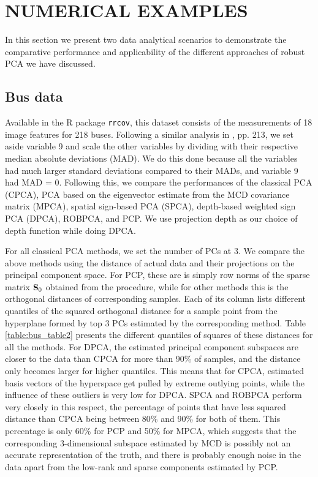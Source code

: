 \section*{\sffamily \Large NUMERICAL EXAMPLES}
\label{section:sec4}

In this section we present two data analytical scenarios to demonstrate the comparative performance and applicability of the different approaches of robust PCA we have discussed.

\subsection*{\sffamily \large Bus data}
Available in the R package \texttt{rrcov}, this dataset consists of the measurements of 18 image features for 218 buses. Following a similar analysis in \cite{maronna06}, pp. 213, we set aside variable 9 and scale the other variables by dividing with their respective median absolute deviations (MAD). We do this done because all the variables had much larger standard deviations compared to their MADs, and variable 9 had MAD = 0. Following this, we compare the performances of the classical PCA (CPCA), PCA based on the eigenvector estimate from the MCD covariance matrix (MPCA), spatial sign-based PCA (SPCA), depth-based weighted sign PCA (DPCA), ROBPCA, and PCP.
We use projection depth as our choice of depth function while doing DPCA.

For all classical PCA methods, we set the number of PCs at 3. We compare the above methods using the distance of actual data and their projections on the principal component space. For PCP, these are is simply row norms of the sparse matrix ${\mathbf{S}}_0$ obtained from the procedure, while for other methods this is the orthogonal distances of corresponding samples. Each of its column lists different quantiles of the squared orthogonal distance for a sample point from the hyperplane formed by top 3 PCs estimated by the corresponding method. Table \ref{table:bus_table2} presents the different quantiles of squares of these distances for all the methods. For DPCA, the estimated principal component subspaces are closer to the data than CPCA for more than 90\% of samples, and the distance only becomes larger for higher quantiles. This means that for CPCA, estimated basis vectors of the hyperspace get pulled by extreme outlying points, while the influence of these outliers is very low for DPCA. SPCA and ROBPCA perform very closely in this respect, the percentage of points that have less squared distance than CPCA being between 80\% and 90\% for both of them. This percentage is only 60\% for PCP and 50\% for MPCA, which suggests that the corresponding 3-dimensional subspace estimated by MCD is possibly not an accurate representation of the truth, and there is probably enough noise in the data apart from the low-rank and sparse components estimated by PCP.

